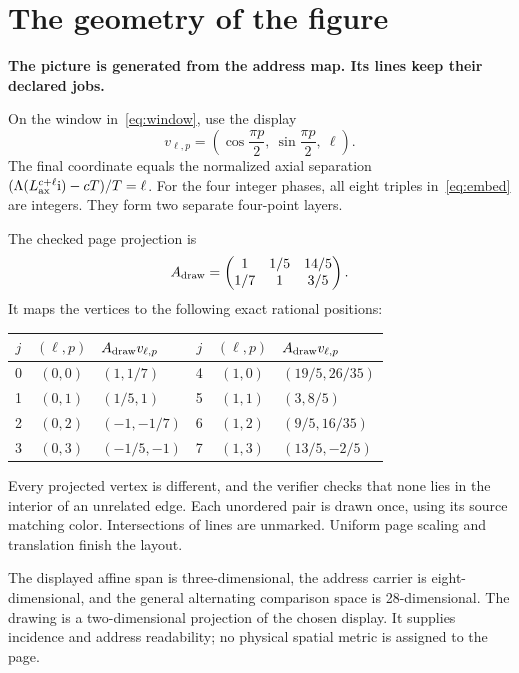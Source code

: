 \documentclass[11pt]{article}
\theoremstyle{definition}\newtheorem{definition}[theorem]{Definition}
\newcommand{\mi}{\mathrm i}\newcommand{\tr}{\mathsf T}
\newcommand{\lead}[1]{\textbf{#1}\par}
\newcommand{\page}{\clearpage}
\begin{document}
\page
\section{The geometry of the figure}
\lead{The picture is generated from the address map. Its lines keep their declared jobs.}
On the window in~\eqref{eq:window}, use the display
\begin{equation}
 v_{\ell,p}=\left(\cos\frac{\pi p}{2},\ \sin\frac{\pi p}{2},\ \ell\right).
 \label{eq:embed}
\end{equation}
The final coordinate equals the normalized axial separation
$(\Lambda(L_{\ax}^{c+\ell}\mi)-cT)/T=\ell$. For the four integer phases, all eight triples in~\eqref{eq:embed} are integers. They form two separate four-point layers.

The checked page projection is
\begin{equation}
 A_{\rm draw}=\begin{pmatrix}1&1/5&14/5\\1/7&1&3/5\end{pmatrix}.
 \label{eq:projection}
\end{equation}
It maps the vertices to the following exact rational positions:
\begin{center}
\begin{tabular}{ccl@{\qquad}ccl}
\toprule
$j$&$(\ell,p)$&$A_{\rm draw}v_{\ell,p}$&$j$&$(\ell,p)$&$A_{\rm draw}v_{\ell,p}$\\\midrule
0&$(0,0)$&$(1,1/7)$&4&$(1,0)$&$(19/5,26/35)$\\
1&$(0,1)$&$(1/5,1)$&5&$(1,1)$&$(3,8/5)$\\
2&$(0,2)$&$(-1,-1/7)$&6&$(1,2)$&$(9/5,16/35)$\\
3&$(0,3)$&$(-1/5,-1)$&7&$(1,3)$&$(13/5,-2/5)$\\\bottomrule
\end{tabular}
\end{center}
Every projected vertex is different, and the verifier checks that none lies in the interior of an unrelated edge. Each unordered pair is drawn once, using its source matching color. Intersections of lines are unmarked. Uniform page scaling and translation finish the layout.

The displayed affine span is three-dimensional, the address carrier is eight-dimensional, and the general alternating comparison space is 28-dimensional. The drawing is a two-dimensional projection of the chosen display. It supplies incidence and address readability; no physical spatial metric is assigned to the page.
\end{document}
